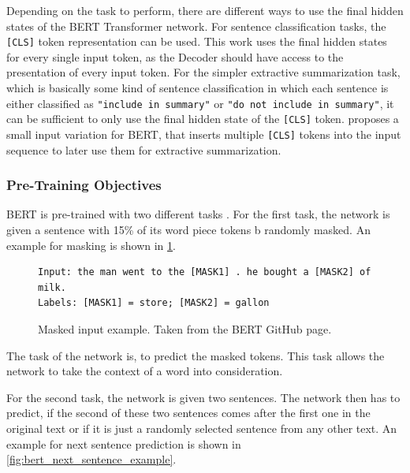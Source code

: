Depending on the task to perform, there are different ways to use the final hidden states of the BERT Transformer network.
For sentence classification tasks, the \texttt{[CLS]} token representation can be used.
This work uses the final hidden states for every single input token, as the Decoder should have access to the presentation of every input token.
For the simpler extractive summarization task, which is basically some kind of sentence classification in which each sentence is either classified as \texttt{"include in summary"} or \texttt{"do not include in summary"}, it can be sufficient to only use the final hidden state of the \texttt{[CLS]} token. 
\cite{1903.10318} proposes a small input variation for BERT, that inserts multiple \texttt{[CLS]} tokens into the input sequence to later use them for extractive summarization.

\subsubsection{Pre-Training Objectives}

BERT is pre-trained with two different tasks \cite[p.~4--5]{devlin2018bert}.
For the first task, the network is given a sentence with 15\% of its word piece tokens b randomly masked.
An example for masking is shown in \cref{fig:bert_masking_example}.

\begin{figure}[h]
\begin{lstlisting}[numbers=none]
Input: the man went to the [MASK1] . he bought a [MASK2] of milk.
Labels: [MASK1] = store; [MASK2] = gallon
\end{lstlisting}
\caption[Masked input example]{Masked input example. Taken from the BERT GitHub page.}
\label{fig:bert_masking_example}
\end{figure}


The task of the network is, to predict the masked tokens.
This task allows the network to take the context of a word into consideration.

For the second task, the network is given two sentences.
The network then has to predict, if the second of these two sentences comes after the first one in the original text or if it is just a randomly selected sentence from any other text.
An example for next sentence prediction is shown in \cref{fig:bert_next_sentence_example}.

